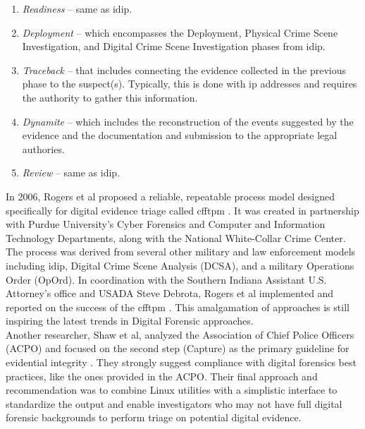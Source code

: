 \documentclass[12pt]{article}
\begin{document}
\vspace{0.5 cm}
\begin{enumerate}
  \item {\em Readiness} -- same as \gls{idip}.
  \item {\em Deployment} -- which encompasses the Deployment,
  Physical Crime Scene Investigation, and Digital Crime Scene
  Investigation phases from \gls{idip}.
  \item {\em Traceback} -- that includes connecting the evidence collected
  in the previous phase to the suspect(s).  Typically, this is done with \gls{ip}
  addresses and requires the authority to gather this information.
  \item {\em Dynamite} -- which includes the reconstruction of the events
  suggested by the evidence and the documentation and submission to the
  appropriate legal authories.
  \item {\em Review} -- same as \gls{idip}.
\end{enumerate}
\vspace{0.5 cm}

In 2006, Rogers et al proposed a reliable, repeatable process 
model designed specifically for digital evidence triage called
\gls{cfftpm} \cite{rogers2006computer}. It was created in partnership
with Purdue University's Cyber Forensics and Computer and Information
Technology Departments, along with the National White-Collar Crime
Center. The process was derived from several other military and law enforcement models
including \gls{idip}, Digital Crime Scene Analysis (DCSA),
and a military Operations Order (OpOrd).  In coordination with the Southern Indiana 
Assistant U.S. Attorney's office and 
USADA Steve Debrota, Rogers et al implemented and reported
on the success of the \gls{cfftpm} \cite{rogers2006computer}.  This amalgamation of approaches is still inspiring 
the latest trends in Digital Forensic approaches.\\

Another researcher, Shaw et al, analyzed the Association of Chief Police Officers (ACPO)
and focused on the second step (Capture) as the primary guideline for evidential
integrity \cite{shaw2013practical}.  They strongly suggest compliance with
digital forensics best practices, like the ones provided in the ACPO.  Their final approach
and recommendation was to combine Linux utilities with a simplistic interface to standardize
the output and enable investigators who may not have full digital forensic backgrounds
to perform triage on potential digital evidence.\\
\end{document}
